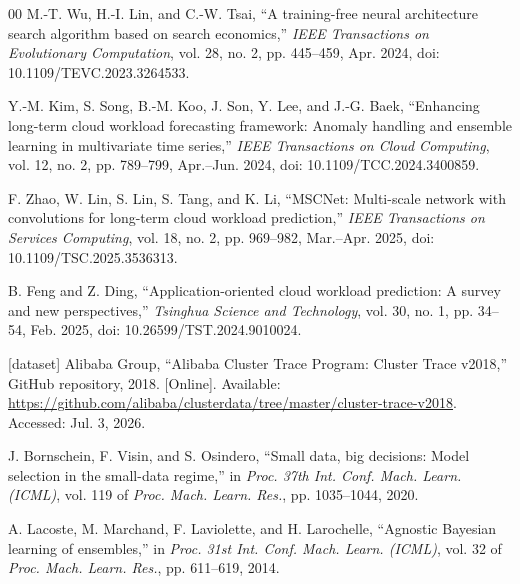 \documentclass[a4paper,fleqn]{cas-sc}
\begin{document}
\begin{thebibliography}{00}
 M.-T. Wu, H.-I. Lin, and C.-W. Tsai, ``A training-free neural architecture search algorithm based on search economics,'' \emph{IEEE Transactions on Evolutionary Computation}, vol. 28, no. 2, pp. 445--459, Apr. 2024, doi: 10.1109/TEVC.2023.3264533.

 Y.-M. Kim, S. Song, B.-M. Koo, J. Son, Y. Lee, and J.-G. Baek, ``Enhancing long-term cloud workload forecasting framework: Anomaly handling and ensemble learning in multivariate time series,'' \emph{IEEE Transactions on Cloud Computing}, vol. 12, no. 2, pp. 789--799, Apr.--Jun. 2024, doi: 10.1109/TCC.2024.3400859.

 F. Zhao, W. Lin, S. Lin, S. Tang, and K. Li, ``MSCNet: Multi-scale network with convolutions for long-term cloud workload prediction,'' \emph{IEEE Transactions on Services Computing}, vol. 18, no. 2, pp. 969--982, Mar.--Apr. 2025, doi: 10.1109/TSC.2025.3536313.

 B. Feng and Z. Ding, ``Application-oriented cloud workload prediction: A survey and new perspectives,'' \emph{Tsinghua Science and Technology}, vol. 30, no. 1, pp. 34--54, Feb. 2025, doi: 10.26599/TST.2024.9010024.

[dataset] Alibaba Group, ``Alibaba Cluster Trace Program: Cluster Trace
v2018,'' GitHub repository, 2018. [Online]. Available:
\url{https://github.com/alibaba/clusterdata/tree/master/cluster-trace-v2018}.
Accessed: Jul. 3, 2026.

J. Bornschein, F. Visin, and S. Osindero,
``Small data, big decisions: Model selection in the small-data regime,''
in \emph{Proc. 37th Int. Conf. Mach. Learn. (ICML)},
vol. 119 of \emph{Proc. Mach. Learn. Res.},
pp. 1035--1044, 2020.

A. Lacoste, M. Marchand, F. Laviolette, and H. Larochelle,
``Agnostic Bayesian learning of ensembles,''
in \emph{Proc. 31st Int. Conf. Mach. Learn. (ICML)},
vol. 32 of \emph{Proc. Mach. Learn. Res.},
pp. 611--619, 2014.


\end{thebibliography}
\end{document}
